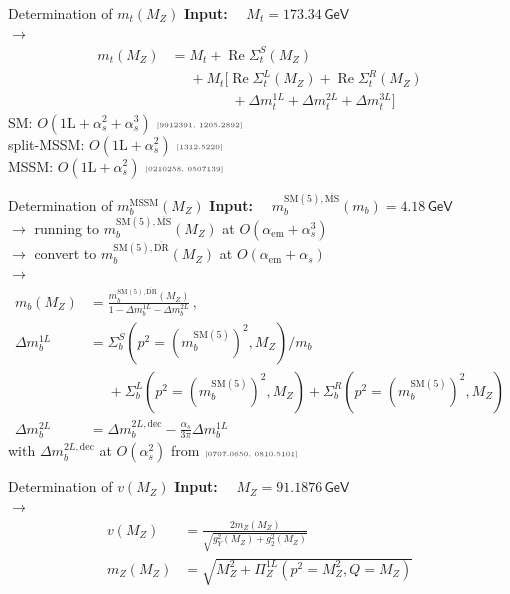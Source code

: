 \documentclass[hyperref={pdfpagelabels=false},ngerman]{beamer}
\newcommand{\eh}[1]{\,\mathsf{#1}}
\newcommand{\mycite}[1]{\ensuremath{\text{\textcolor{darkgray}{\tiny [#1]}}}}
\DeclareMathOperator{\re}{Re}
\renewcommand{\emph}{\textbf}
\newcommand{\DRbar}{\ensuremath{\overline{\text{DR}}}}
\newcommand{\MSbar}{\ensuremath{\overline{\text{MS}}}}
\newcommand{\SM}{\ensuremath{\text{SM}}}
\newcommand{\MSSM}{\ensuremath{\text{MSSM}}}
\newcommand{\as}{\alpha_s}
\newcommand{\aem}{\alpha_\text{em}}
\begin{document}
\begin{frame}[noframenumbering]{Determination of $m_t(M_Z)$}
  \emph{Input:} \ \ $M_t = 173.34\eh{GeV}$\\[1em]
  $\rightarrow$
  \begin{align*}
    m_{t}(M_Z) &= M_t +
    \re\Sigma_{t}^{S}(M_Z) \\
    &\phantom{={}} + M_t \Big[ \re\Sigma_{t}^{L}(M_Z) +
    \re\Sigma_{t}^{R}(M_Z) \\
    &\phantom{={}} \qquad\quad
      + \Delta m_t^{1L} + \Delta m_t^{2L} + \Delta m_t^{3L} \Big]
  \end{align*}
  SM: $O(\text{1L} + \as^2 + \as^3)$ \mycite{9912391, 1205.2892} \\
  split-MSSM: $O(\text{1L} + \as^2)$ \mycite{1312.5220}\\
  MSSM: $O(\text{1L} + \as^2)$ \mycite{0210258, 0507139}
\end{frame}

\begin{frame}[noframenumbering]{Determination of $m_b^{\MSSM}(M_Z)$}
  \emph{Input:} \ \ $m_b^{\SM(5),\MSbar}(m_b) = 4.18\eh{GeV}$\\[1em]
  $\rightarrow$ running to $m_b^{\SM(5),\MSbar}(M_Z)$ at $O(\aem + \as^3)$\\[1em]
  $\rightarrow$ convert to $m_b^{\SM(5),\DRbar}(M_Z)$ at $O(\aem + \as)$\\[1em]
  $\rightarrow$
  \begin{align*}
    m_b(M_Z) &= \frac{m_b^{\SM(5),\DRbar}(M_Z)}{1 - \Delta m_b^{1L} - \Delta m_b^{2L}} \,, \\
    \Delta m_b^{1L} &= \Sigma_{b}^S(p^2=(m_b^{\SM(5)})^2,M_Z)/m_b\\
           &\phantom{={}}+ \Sigma_{b}^L(p^2=(m_b^{\SM(5)})^2,M_Z)
             + \Sigma_{b}^R(p^2=(m_b^{\SM(5)})^2,M_Z)\\
    \Delta m_b^{2L} &= \Delta m_b^{2L,\text{dec}} - \frac{\as}{3\pi}\Delta m_b^{1L}
  \end{align*}
  with $\Delta m_b^{2L,\text{dec}}$ at $O(\as^2)$ from \mycite{0707.0650, 0810.5101}
\end{frame}

\begin{frame}[noframenumbering]{Determination of $v(M_Z)$}
  \emph{Input:} \ \ $M_Z = 91.1876\eh{GeV}$\\[1em]
  $\rightarrow$
  \begin{align*}
    v(M_Z) &= \frac{2 m_Z(M_Z)}{\sqrt{g_Y^2(M_Z) + g_2^2(M_Z)}} \\
    m_Z(M_Z) &= \sqrt{M_Z^2 + \Pi_Z^{1L}(p^2=M_Z^2,Q=M_Z)}
  \end{align*}
\end{frame}
\end{document}
